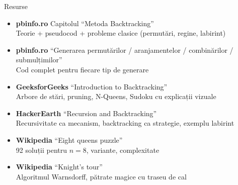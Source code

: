 ﻿\documentclass[10pt]{beamer}
\begin{document}
\begin{frame}{Resurse}
  \begin{itemize}\itemsep4pt
    \item \textbf{pbinfo.ro} \textemdash{} Capitolul ``Metoda Backtracking''\\
      Teorie + pseudocod + probleme clasice (permutări, regine, labirint)

    \item \textbf{pbinfo.ro} \textemdash{} ``Generarea permutărilor / aranjamentelor /
      combinărilor / submulțimilor''\\
      Cod complet pentru fiecare tip de generare

    \item \textbf{GeeksforGeeks} \textemdash{} ``Introduction to Backtracking''\\
      Arbore de stări, pruning, N-Queens, Sudoku cu explicații vizuale

    \item \textbf{HackerEarth} \textemdash{} ``Recursion and Backtracking''\\
      Recursivitate ca mecanism, backtracking ca strategie, exemplu labirint

    \item \textbf{Wikipedia} \textemdash{} ``Eight queens puzzle''\\
      92 soluții pentru $n=8$, variante, complexitate

    \item \textbf{Wikipedia} \textemdash{} ``Knight's tour''\\
      Algoritmul Warnsdorff, pătrate magice cu traseu de cal
  \end{itemize}
\end{frame}
\end{document}
